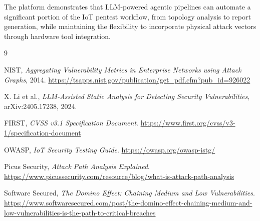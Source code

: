 \documentclass[11pt,a4paper]{article}
\begin{document}
The platform demonstrates that LLM-powered agentic pipelines can automate a significant portion of the IoT pentest workflow, from topology analysis to report generation, while maintaining the flexibility to incorporate physical attack vectors through hardware tool integration.

\begin{thebibliography}{9}

NIST, \emph{Aggregating Vulnerability Metrics in Enterprise Networks using Attack Graphs}, 2014.
\url{https://tsapps.nist.gov/publication/get_pdf.cfm?pub_id=926022}

X. Li et al., \emph{LLM-Assisted Static Analysis for Detecting Security Vulnerabilities}, arXiv:2405.17238, 2024.

FIRST, \emph{CVSS v3.1 Specification Document}.
\url{https://www.first.org/cvss/v3-1/specification-document}

OWASP, \emph{IoT Security Testing Guide}.
\url{https://owasp.org/owasp-istg/}

Picus Security, \emph{Attack Path Analysis Explained}.
\url{https://www.picussecurity.com/resource/blog/what-is-attack-path-analysis}

Software Secured, \emph{The Domino Effect: Chaining Medium and Low Vulnerabilities}.
\url{https://www.softwaresecured.com/post/the-domino-effect-chaining-medium-and-low-vulnerabilities-is-the-path-to-critical-breaches}

\end{thebibliography}
\end{document}
